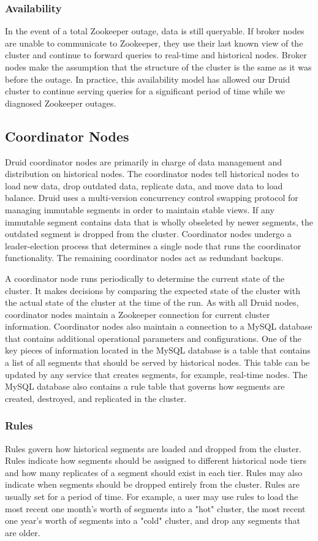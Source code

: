 \documentclass{acm_proc_article-sp}
\begin{document}
\subsubsection{Availability}
In the event of a total Zookeeper outage, data is still queryable.  If broker
nodes are unable to communicate to Zookeeper, they use their last known view of
the cluster and continue to forward queries to real-time and historical nodes.
Broker nodes make the assumption that the structure of the cluster is the same
as it was before the outage. In practice, this availability model has allowed
our Druid cluster to continue serving queries for a significant period of time while we
diagnosed Zookeeper outages. 

\subsection{Coordinator Nodes}
Druid coordinator nodes are primarily in charge of data management and
distribution on historical nodes. The coordinator nodes tell historical nodes
to load new data, drop outdated data, replicate data, and move data to load
balance. Druid uses a multi-version concurrency control swapping protocol for
managing immutable segments in order to maintain stable views.  If any
immutable segment contains data that is wholly obseleted by newer segments, the
outdated segment is dropped from the cluster. Coordinator nodes undergo a
leader-election process that determines a single node that runs the coordinator
functionality. The remaining coordinator nodes act as redundant backups.

A coordinator node runs periodically to determine the current state of the
cluster. It makes decisions by comparing the expected state of the cluster with
the actual state of the cluster at the time of the run. As with all Druid
nodes, coordinator nodes maintain a Zookeeper connection for current cluster
information. Coordinator nodes also maintain a connection to a MySQL
database that contains additional operational parameters and configurations.
One of the key pieces of information located in the MySQL database is a table
that contains a list of all segments that should be served by historical nodes.
This table can be updated by any service that creates segments, for example,
real-time nodes. The MySQL database also contains a rule table that governs how
segments are created, destroyed, and replicated in the cluster.

\subsubsection{Rules}
Rules govern how historical segments are loaded and dropped from the cluster.
Rules indicate how segments should be assigned to different historical node
tiers and how many replicates of a segment should exist in each tier. Rules may
also indicate when segments should be dropped entirely from the cluster. Rules
are usually set for a period of time.  For example, a user may use rules to
load the most recent one month's worth of segments into a "hot" cluster, the
most recent one year's worth of segments into a "cold" cluster, and drop any
segments that are older.
\end{document}
